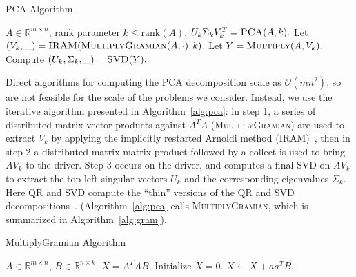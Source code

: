
\begin{algorithm}[tb]
    \caption{\textsc{PCA} Algorithm}
    \label{alg:pca}
    \begin{algorithmic}[1]
      \Require $A \in \mathbb{R}^{m\times n}$, rank parameter $k \leq \textrm{rank}(A).$
      \Ensure $U_k \Sigma_k V_k^T = \textsc{PCA}(A, k).$
      \State Let $(V_k, \_) = \textsc{IRAM}(\textsc{MultiplyGramian}(A, \cdot), k).$
      \State Let $Y = \textsc{Multiply}(A, V_k).$
      \State Compute $(U_k, \Sigma_k, \_) = \textsc{SVD}(Y).$
    \end{algorithmic}
  \end{algorithm}
  
Direct algorithms for computing the PCA decomposition scale as $\mathcal{O}(mn^2)$, so are not feasible for the scale of the problems we consider. Instead, we use the iterative algorithm presented in Algorithm~\ref{alg:pca}: in step 1, a series of distributed matrix-vector products against $A^T A$  (\textsc{MultiplyGramian}) are used to extract $V_k$ by applying the implicitly restarted Arnoldi method (\textsc{IRAM})~\cite{lehoucq1996deflation}, then in step 2 a distributed matrix-matrix product followed by a collect is used to bring $AV_k$ to the driver. Step 3 occurs on the driver, and computes a final SVD on $AV_k$ to extract the top left singular vectors $U_k$ and the corresponding eigenvalues $\Sigma_k.$ Here QR and SVD compute the ``thin'' versions of the QR and SVD decompositions~\cite{GVL96}. (Algorithm~\ref{alg:pca} calls \textsc{MultiplyGramian}, which is summarized in Algorithm~\ref{alg:gram}).

  \begin{algorithm}[tb]
    \caption{{\sc MultiplyGramian} Algorithm}
    \label{alg:gram}
    \begin{algorithmic}[1]
      \Require $A \in \mathbb{R}^{m\times n}$, $B \in \mathbb{R}^{n\times k}$.
      \Ensure $X = A^T A B$.
      \State Initialize $X = 0$.
          \State $X \gets X + a a^T B$.
      \EndFor
    \end{algorithmic}
\end{algorithm}

